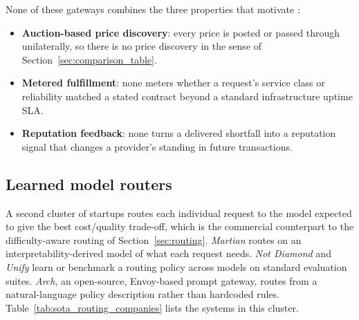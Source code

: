 None of these gateways combines the three properties that motivate
\NoesisMarket:

\begin{itemize}
  \item \textbf{Auction-based price discovery}: every price is posted or
    passed through unilaterally, so there is no price discovery in the
    sense of Section~\ref{sec:comparison_table}.
  \item \textbf{Metered fulfillment}: none meters whether a request's
    service class or reliability matched a stated contract beyond a
    standard infrastructure uptime SLA.
  \item \textbf{Reputation feedback}: none turns a delivered shortfall into
    a reputation signal that changes a provider's standing in future
    transactions.
\end{itemize}

\subsection{Learned model routers}
\label{sec:sota_routing}

A second cluster of startups routes each individual request to the model
expected to give the best cost/quality trade-off, which is the commercial
counterpart to the difficulty-aware routing of Section~\ref{sec:routing}.
\emph{Martian} routes on an interpretability-derived model of what each
request needs. \emph{Not Diamond} and \emph{Unify} learn or benchmark a
routing policy across models on standard evaluation suites. \emph{Arch},
an open-source, Envoy-based prompt gateway, routes from a natural-language
policy description rather than hardcoded rules.
Table~\ref{tab:sota_routing_companies} lists the systems in this cluster.

